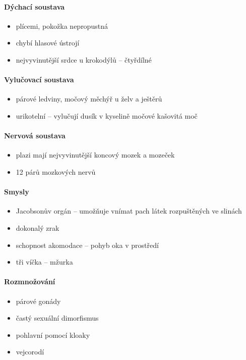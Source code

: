 \paragraph{Dýchací soustava}
\begin{itemize}
\item plícemi, pokožka nepropustná
\item chybí hlasové ústrojí
\item nejvyvinutější srdce u krokodýlů -- čtyřdílné
\end{itemize}

\paragraph{Vylučovací soustava}
\begin{itemize}
\item párové ledviny, močový měchýř u želv a ještěrů
\item urikotelní -- vylučují dusík v kyselině močové \ra kašovitá moč
\end{itemize}

\paragraph{Nervová soustava}
\begin{itemize}
\item plazi mají nejvyvinutější koncový mozek a mozeček
\item 12 párů mozkových nervů
\end{itemize}

\paragraph{Smysly}
\begin{itemize}
\item Jacobsonův orgán -- umožňuje vnímat pach látek rozpuštěných ve slinách
\item dokonalý zrak
\item schopnost akomodace -- pohyb oka v prostředí
\item tři víčka -- mžurka
\end{itemize}

\paragraph{Rozmnožování}
\begin{itemize}
\item párové gonády
\item častý sexuální dimorfismus
\item pohlavní pomocí kloaky
\item vejcorodí
\end{itemize}

